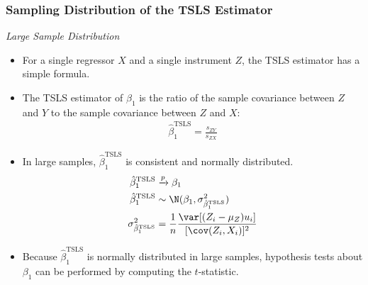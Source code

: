 

\begin{frame}
\frametitle{Sampling Distribution of the TSLS Estimator}
\emph{Large Sample Distribution} 
\begin{itemize}
\item For a single regressor $X$ and a single instrument $Z$, the TSLS estimator has a simple formula.
\item The TSLS estimator of $\beta_{1}$ is the ratio of the sample covariance between $Z$ and $Y$ to the sample covariance between $Z$ and $X$:
\begin{align*}
\hat{\beta}_{1}^{\text{TSLS}} 
  = \frac{s_{ZY}}{s_{ZX}}
\end{align*}
\item In large samples, $\hat{\beta}_{1}^{\text{TSLS}}$ is consistent and normally distributed. 
\begin{align*}
\hat{\beta}_{1}^{\text{TSLS}}
    & \xrightarrow{p} \beta_{1}\\
\hat{\beta}_{1}^{\text{TSLS}} 
    & \sim \N(\beta_{1}, \sigma^{2}_{\hat{\beta}_{1}^{\text{TSLS}}})\\
\sigma^{2}_{\hat{\beta}_{1}^{\text{TSLS}}} 
    & = \frac{1}{n} \frac{\var[(Z_{i}-\mu_{Z})u_{i}]}{[\cov(Z_{i}, X_{i})]^{2}}
\end{align*}
\item Because $\hat{\beta}_{1}^{\text{TSLS}}$ is normally distributed in large samples, hypothesis
tests about $\beta_{1}$ can be performed by computing the $t$-statistic.
\end{itemize}
\end{frame}

